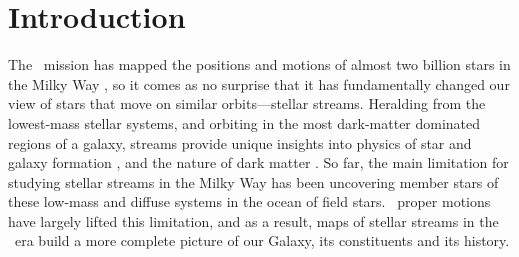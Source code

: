 \documentclass[final,5p,times,twocolumn,authoryear]{elsarticle}
\begin{document}
\begin{frontmatter}
%

\begin{keyword}



\end{keyword}

\end{frontmatter}


\section{Introduction}
\label{sec:intro}

The \gaia\ mission has mapped the positions and motions of almost two billion stars in the Milky Way \citep{gaiamission:2016, gaiadr1, gaiadr2, gaiaedr3, gaiadr3}, so it comes as no surprise that it has fundamentally changed our view of stars that move on similar orbits---stellar streams.
Heralding from the lowest-mass stellar systems, and orbiting in the most dark-matter dominated regions of a galaxy, streams provide unique insights into physics of star and galaxy formation \citep{smith:2016, ferguson:2016, carlin:2016}, and the nature of dark matter \citep{johnston:2016a, johnston:2016b}.
So far, the main limitation for studying stellar streams in the Milky Way has been uncovering member stars of these low-mass and diffuse systems in the ocean of field stars.
\gaia\ proper motions have largely lifted this limitation, and as a result, maps of stellar streams in the \gaia\ era build a more complete picture of our Galaxy, its constituents and its history.
\end{document}
